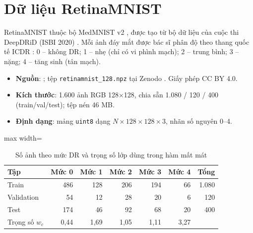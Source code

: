 \section{Dữ liệu RetinaMNIST}

RetinaMNIST thuộc bộ MedMNIST v2 \cite{yang2023medmnist}, được tạo từ bộ dữ liệu của cuộc thi DeepDRiD (ISBI 2020) \cite{liu2022deepdrid}. Mỗi ảnh đáy mắt được bác sĩ phân độ theo thang quốc tế ICDR \cite{wilkinson2003}: 0 – không DR; 1 – nhẹ (chỉ có vi phình mạch); 2 – trung bình; 3 – nặng; 4 – tăng sinh (tân mạch).

\begin{itemize}
  \item \textbf{Nguồn}: ; tệp \texttt{retinamnist\_128.npz} tại Zenodo . Giấy phép CC BY 4.0.
  \item \textbf{Kích thước}: 1.600 ảnh RGB 128×128, chia sẵn 1.080 / 120 / 400 (train/val/test); tệp nén 46 MB.
  \item \textbf{Định dạng}: mảng \texttt{uint8} dạng $N\times128\times128\times3$, nhãn số nguyên 0–4.
\end{itemize}



\begin{table}[H]
\centering
\caption{Số ảnh theo mức DR và trọng số lớp dùng trong hàm mất mát}
\label{tab:retina-dist}
\small
\begin{adjustbox}{max width=\linewidth}
\begin{tabular}{@{}lrrrrrr@{}}
\toprule
\textbf{Tập} & \textbf{Mức 0} & \textbf{Mức 1} & \textbf{Mức 2} & \textbf{Mức 3} & \textbf{Mức 4} & \textbf{Tổng} \\
\midrule
Train & 486 & 128 & 206 & 194 & 66 & 1.080 \\
Validation & 54 & 12 & 28 & 20 & 6 & 120 \\
Test & 174 & 46 & 92 & 68 & 20 & 400 \\
\midrule
Trọng số $w_c$ & 0,44 & 1,69 & 1,05 & 1,11 & 3,27 & \\
\bottomrule
\end{tabular}
\end{adjustbox}
\end{table}

